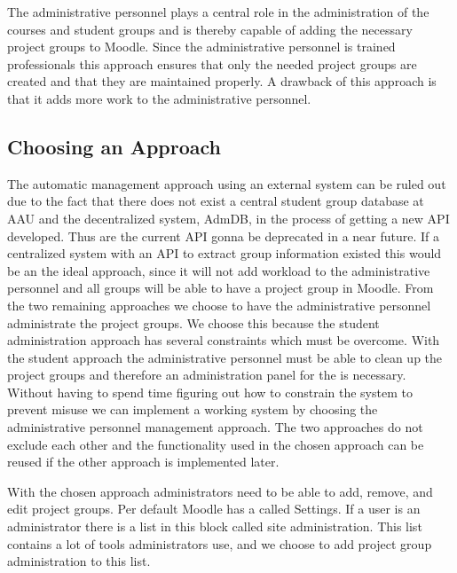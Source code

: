 The administrative personnel plays a central role in the administration of the courses and student groups and is thereby capable of adding the necessary project groups to Moodle. 
Since the administrative personnel is trained professionals this approach ensures that only the needed project groups are created and that they are maintained properly. 
A drawback of this approach is that it adds more work to the administrative personnel.


\subsection{Choosing an Approach}
The automatic management approach using an external system can be ruled out due to the fact that there does not exist a central student group database at AAU and the decentralized system, AdmDB, in the process of getting a new API developed.
Thus are the current API gonna be deprecated in a near future. 
If a centralized system with an API to extract group information existed this would be an the ideal approach, since it will not add workload to the administrative personnel and all groups will be able to have a project group in Moodle. 
From the two remaining approaches we choose to have the administrative personnel administrate the project groups. 
We choose this because the student administration approach has several constraints which must be overcome. 
With the student approach the administrative personnel must be able to clean up the project groups and therefore an administration panel for the \admpers{} is necessary.
Without having to spend time figuring out how to constrain the system to prevent misuse we can implement a working system by choosing the administrative personnel management approach.
The two approaches do not exclude each other and the functionality used in the chosen approach can be reused if the other approach is implemented later.

With the chosen approach administrators need to be able to add, remove, and edit project groups.
Per default Moodle has a \block{} called Settings. 
If a user is an administrator there is a list in this block called site administration. 
This list contains a lot of tools administrators use, and we choose to add project group administration to this list. 


